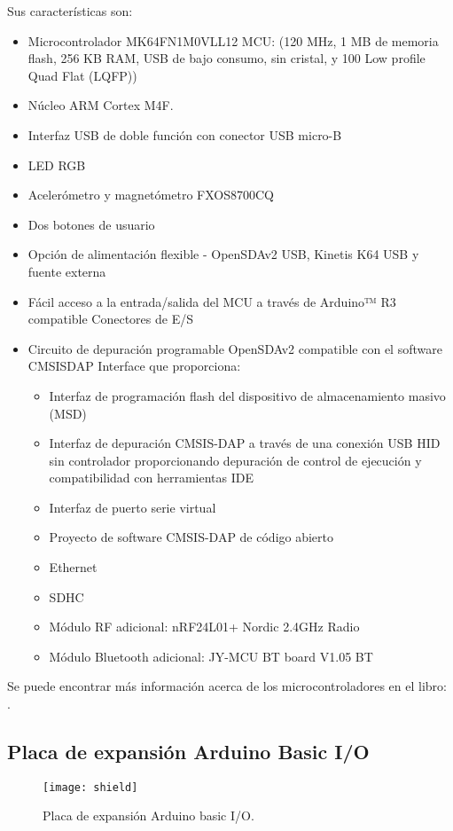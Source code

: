 Sus características son:
\begin{itemize}
\item Microcontrolador MK64FN1M0VLL12 MCU: (120 MHz, 1 MB de memoria flash, 256 KB RAM, USB de bajo consumo, sin cristal, y 100 Low profile Quad Flat (LQFP))
\item Núcleo ARM Cortex M4F. \cite{Cortex}
\item Interfaz USB de doble función con conector USB micro-B
\item LED RGB
\item Acelerómetro y magnetómetro FXOS8700CQ
\item Dos botones de usuario
\item Opción de alimentación flexible - OpenSDAv2 USB, Kinetis K64 USB y fuente externa
\item Fácil acceso a la entrada/salida del MCU a través de Arduino™ R3 compatible Conectores de E/S
\item Circuito de depuración programable OpenSDAv2 compatible con el software CMSISDAP Interface que proporciona:
\begin{itemize}
\item Interfaz de programación flash del dispositivo de almacenamiento masivo (MSD)
\item Interfaz de depuración CMSIS-DAP a través de una conexión USB HID sin controlador proporcionando depuración de control de ejecución y compatibilidad con herramientas IDE
\item Interfaz de puerto serie virtual
\item Proyecto de software CMSIS-DAP de código abierto
\item Ethernet
\item SDHC
\item Módulo RF adicional: nRF24L01+ Nordic 2.4GHz Radio
\item Módulo Bluetooth adicional: JY-MCU BT board V1.05 BT
\end{itemize}
\end{itemize}
 

Se puede encontrar más información acerca de los microcontroladores en el libro: \cite{Freescale}.

\subsection{Placa de expansión Arduino Basic I/O}

\begin{figure}[!h]
	\centering
	\texttt{[image: shield]}
	\caption{Placa de expansión Arduino basic I/O.}
\end{figure}
\FloatBarrier

